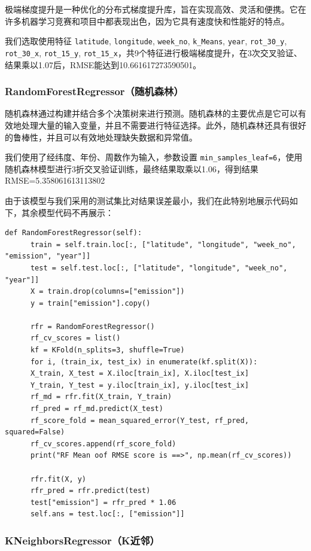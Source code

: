\documentclass{ctexart}
\begin{document}
极端梯度提升是一种优化的分布式梯度提升库，旨在实现高效、灵活和便携。它在许多机器学习竞赛和项目中都表现出色，因为它具有速度快和性能好的特点。

我们选取使用特征 \texttt{latitude}, \texttt{longitude}, \texttt{week\_no}, \texttt{k\_Means}, \texttt{year}, \texttt{rot\_30\_y}, \texttt{rot\_30\_x}, \texttt{rot\_15\_y}, \texttt{rot\_15\_x}，共9个特征进行极端梯度提升，在3次交叉验证、结果乘以1.07后，RMSE能达到10.661617273590501。

\subsubsection{RandomForestRegressor（随机森林）}

随机森林通过构建并结合多个决策树来进行预测。随机森林的主要优点是它可以有效地处理大量的输入变量，并且不需要进行特征选择。此外，随机森林还具有很好的鲁棒性，并且可以有效地处理缺失数据和异常值。

我们使用了经纬度、年份、周数作为输入，参数设置 \texttt{min\_samples\_leaf=6}，使用随机森林模型进行3折交叉验证训练，最终结果取乘以1.06，得到结果RMSE=5.358061613113802

由于该模型与我们采用的测试集比对结果误差最小，我们在此特别地展示代码如下，其余模型代码不再展示：

\begin{lstlisting}[style=Python]
def RandomForestRegressor(self):
      train = self.train.loc[:, ["latitude", "longitude", "week_no", "emission", "year"]]
      test = self.test.loc[:, ["latitude", "longitude", "week_no", "year"]]
      X = train.drop(columns=["emission"])
      y = train["emission"].copy()

      rfr = RandomForestRegressor()
      rf_cv_scores = list()
      kf = KFold(n_splits=3, shuffle=True)
      for i, (train_ix, test_ix) in enumerate(kf.split(X)):
      X_train, X_test = X.iloc[train_ix], X.iloc[test_ix]
      Y_train, Y_test = y.iloc[train_ix], y.iloc[test_ix]
      rf_md = rfr.fit(X_train, Y_train)
      rf_pred = rf_md.predict(X_test)
      rf_score_fold = mean_squared_error(Y_test, rf_pred, squared=False)
      rf_cv_scores.append(rf_score_fold)
      print("RF Mean oof RMSE score is ==>", np.mean(rf_cv_scores))

      rfr.fit(X, y)
      rfr_pred = rfr.predict(test)
      test["emission"] = rfr_pred * 1.06
      self.ans = test.loc[:, ["emission"]]
\end{lstlisting}

\subsubsection{KNeighborsRegressor（K近邻）}
\end{document}
